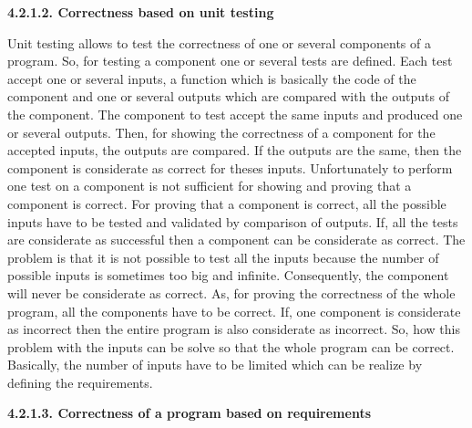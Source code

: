 \documentclass[conference,compsoc]{IEEEtran}
\begin{document}
\noindent
\newline  
\textbf{4.2.1.2. Correctness based on unit testing}
\newline

Unit testing allows to test the correctness of one or several components of a program. So, for testing a component one or several tests are defined. Each test accept one or several inputs, a function which is basically the code of the component and one or several outputs which are compared with the outputs of the component. The component to test accept the same inputs and produced one or several outputs. 
\newline
Then, for showing the correctness of a component for the accepted inputs, the outputs are compared. If the outputs are the same, then the component is considerate as correct for theses inputs. 
\newline
Unfortunately to perform one test on a component is not sufficient for showing and proving that a component is correct. For proving that a component is correct, all the possible inputs have to be tested and validated by comparison of outputs. If, all the tests are considerate as successful then a component can be considerate as correct. 
\newline
The problem is that it is not possible to test all the inputs because the number of possible inputs is sometimes too big and infinite. Consequently, the component will never be considerate as correct. As, for proving the correctness of the whole program, all the components have to be correct. If, one component is considerate as incorrect then the entire program is also considerate as incorrect. 
\newline
So, how this problem with the inputs can be solve so that the whole program can be correct. Basically, the number of inputs have to be limited which can be realize by defining the requirements.

\noindent
\newline  
\textbf{4.2.1.3. Correctness of a program based on requirements}
\newline
\end{document}
